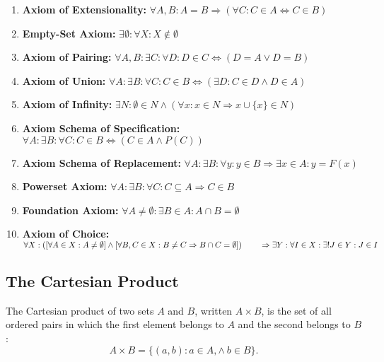 \begin{enumerate}[label = \Roman*.]
	\item \textbf{Axiom of Extensionality:} \quad \(\forall A, B: A = B \Rightarrow (\forall C: C \in A \Leftrightarrow C \in B)\)
	\item \textbf{Empty-Set Axiom:} \quad \(\exists \emptyset : \forall X: X \notin \emptyset\)
	\item \textbf{Axiom of Pairing:} \quad \(\forall A, B: \exists C: \forall D: D \in C \Leftrightarrow (D = A \lor D = B)\)
	\item \textbf{Axiom of Union:} \quad \(\forall A: \exists B: \forall C: C \in B \Leftrightarrow (\exists D: C \in D \land D \in A)\)
	\item \textbf{Axiom of Infinity:} \quad \(\exists N: \emptyset \in N \land (\forall x: x \in N \Rightarrow x \cup \{x\} \in N)\)
	\item \textbf{Axiom Schema of Specification:} \quad \(\forall A: \exists B: \forall C: C \in B \Leftrightarrow (C \in A \land P(C))\)
	\item \textbf{Axiom Schema of Replacement:} \quad \(\forall A: \exists B: \forall y: y \in B \Rightarrow \exists x \in A: y = F(x)\)
	\item \textbf{Powerset Axiom:} \quad \(\forall A: \exists B: \forall C: C \subseteq A \Rightarrow C \in B\)
	\item \textbf{Foundation Axiom:} \quad \(\forall A \ne \emptyset: \exists B \in A: A \cap B = \emptyset\)
	\item \textbf{Axiom of Choice:} \quad \(\forall X:
		      \left( \left[ \forall A \in X: A \ne \emptyset \right] \land
		      \left[ \forall B, C \in X: B \ne C \Rightarrow B \cap C = \emptyset \right] \right) \\
		      \qquad \Rightarrow \exists Y: \forall I \in X: \exists! J \in Y: J \in I\)
\end{enumerate}

\subsection{The Cartesian Product}

The Cartesian product of two sets \(A\) and \(B\), written \(A \times B\), is the set of all ordered pairs in which the first element belongs to \(A\) and the second belongs to \(B\):
\[A \times B = \{ (a, b) : a \in A, \land\ b \in B\}.\]

